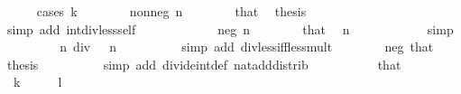 \begin{isabellebody}
\ \ \ \ \isamarkupfalse%
\ {\isacharparenleft}{\kern0pt}cases\ k{\isacharparenright}{\kern0pt}\isanewline
\ \ \ \ \ \ \isamarkupfalse%
\ {\isacharparenleft}{\kern0pt}nonneg\ n{\isacharparenright}{\kern0pt}\isanewline
\ \ \ \ \ \ \isamarkupfalse%
\ that\ \isamarkupfalse%
\ {\isacharquery}{\kern0pt}thesis\isanewline
\ \ \ \ \ \ \ \ \isamarkupfalse%
\ {\isacharparenleft}{\kern0pt}simp\ add{\isacharcolon}{\kern0pt}\ int{\isacharunderscore}{\kern0pt}div{\isacharunderscore}{\kern0pt}less{\isacharunderscore}{\kern0pt}self{\isacharparenright}{\kern0pt}\isanewline
\ \ \ \ \isamarkupfalse%
\isanewline
\ \ \ \ \ \ \isamarkupfalse%
\ {\isacharparenleft}{\kern0pt}neg\ n{\isacharparenright}{\kern0pt}\isanewline
\ \ \ \ \ \ \isamarkupfalse%
\ that\ \isamarkupfalse%
\ {\isacartoucheopen}n\ {\isasymnoteq}\ {}{\isacartoucheclose}\isanewline
\ \ \ \ \ \ \ \ \isamarkupfalse%
\ simp\isanewline
\ \ \ \ \ \ \isamarkupfalse%
\ \isamarkupfalse%
\ {\isacartoucheopen}n\ div\ {}\ {\isacharless}{\kern0pt}\ n{\isacartoucheclose}\isanewline
\ \ \ \ \ \ \ \ \isamarkupfalse%
\ {\isacharparenleft}{\kern0pt}simp\ add{\isacharcolon}{\kern0pt}\ div{\isacharunderscore}{\kern0pt}less{\isacharunderscore}{\kern0pt}iff{\isacharunderscore}{\kern0pt}less{\isacharunderscore}{\kern0pt}mult{\isacharparenright}{\kern0pt}\isanewline
\ \ \ \ \ \ \isamarkupfalse%
\ neg\ that\ \isamarkupfalse%
\ {\isacharquery}{\kern0pt}thesis\isanewline
\ \ \ \ \ \ \ \ \isamarkupfalse%
\ {\isacharparenleft}{\kern0pt}simp\ add{\isacharcolon}{\kern0pt}\ divide{\isacharunderscore}{\kern0pt}int{\isacharunderscore}{\kern0pt}def\ nat{\isacharunderscore}{\kern0pt}add{\isacharunderscore}{\kern0pt}distrib{\isacharparenright}{\kern0pt}\isanewline
\ \ \ \ \isamarkupfalse%
\isanewline
\ \ \ \ \isamarkupfalse%
\ that\ \isamarkupfalse%
\ {\isacharasterisk}{\kern0pt}{\isacharcolon}{\kern0pt}\ {\isacartoucheopen}k\ {\isasymnotin}\ {\isacharbraceleft}{\kern0pt}{}{\isacharcomma}{\kern0pt}\ {\isacharminus}{\kern0pt}\ {}{\isacharbraceright}{\kern0pt}\ {\isasymor}\ l\ {\isasymnotin}\ {\isacharbraceleft}{\kern0pt}{}{\isacharcomma}{\kern0pt}\ {\isacharminus}{\kern0pt}\ {}{\isacharbraceright}{\kern0pt}{\isacartoucheclose}\isanewline
\ \ \ \ \ \ \isamarkupfalse%

\end{isabellebody}
